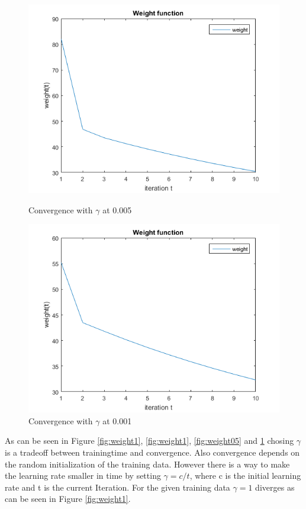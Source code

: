 \begin{figure}[!ht]
	\begin{minipage}{0.5 \textwidth}
		\centering
		\includegraphics[width=1\textwidth]{img/WeightFunction005}
		\caption{Convergence with $\gamma$ at 0.005}
		\label{fig:weight005}
	\end{minipage}
	\begin{minipage}{0.5 \textwidth}
		\centering
		\includegraphics[width=1\textwidth]{img/WeightFunction001}
		\caption{Convergence with $\gamma$ at 0.001}
		\label{fig:weight001}
	\end{minipage}
\end{figure}

As can be seen in Figure \ref{fig:weight1}, \ref{fig:weight1}, \ref{fig:weight05} and \ref{fig:weight001} chosing $\gamma$ is a tradeoff between trainingtime and convergence. Also convergence depends on the random initialization of the training data. However there is a way to make the learning rate smaller in time by setting $\gamma = c/t$, where c is the initial learning rate and t is the current Iteration. For the given training data $\gamma = 1$ diverges as can be seen in Figure \ref{fig:weight1}.





